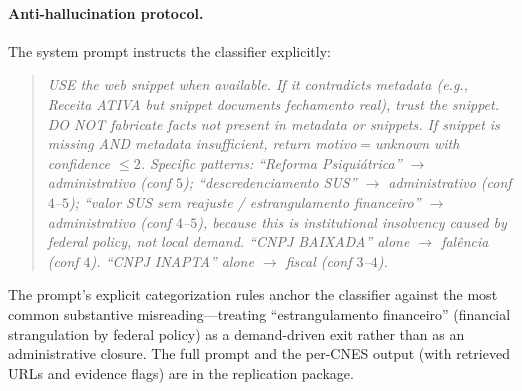 \paragraph{Anti-hallucination protocol.} The system prompt instructs
the classifier explicitly:

\begin{quote}
\small\itshape
USE the web snippet when available. If it contradicts metadata
(e.g., Receita ATIVA but snippet documents fechamento real), trust the
snippet. DO NOT fabricate facts not present in metadata or snippets.
If snippet is missing AND metadata insufficient, return motivo$=$unknown
with confidence $\leq 2$. Specific patterns: ``Reforma Psiquiátrica''
$\to$ administrativo (conf $5$); ``descredenciamento SUS'' $\to$
administrativo (conf $4$--$5$); ``valor SUS sem reajuste /
estrangulamento financeiro'' $\to$ administrativo (conf $4$--$5$),
because this is institutional insolvency caused by federal policy, not
local demand. ``CNPJ BAIXADA'' alone $\to$ fal\^encia (conf $4$).
``CNPJ INAPTA'' alone $\to$ fiscal (conf $3$--$4$).
\end{quote}

The prompt's explicit categorization rules anchor the classifier
against the most common substantive misreading---treating
``estrangulamento financeiro'' (financial strangulation by federal
policy) as a demand-driven exit rather than as an administrative
closure. The full prompt and the per-CNES output (with retrieved
URLs and evidence flags) are in the replication package.

